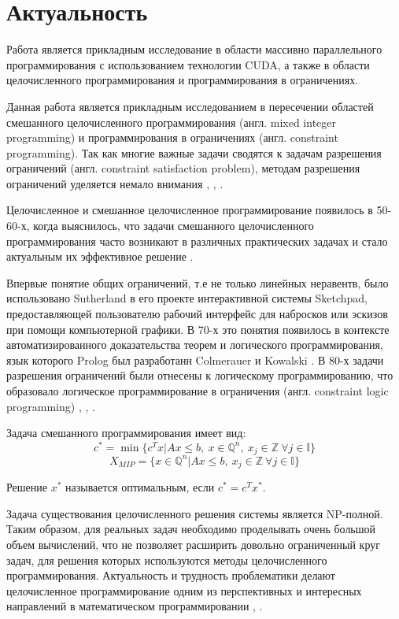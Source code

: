 \documentclass[a4paper,14pt,russian]{extreport}
\begin{document}
\section{Актуальность}

Работа является прикладным исследование в области массивно параллельного программирования с использованием технологии CUDA, а также в области целочисленного программирования и программирования в ограничениях.
\par Данная работа является прикладным исследованием в пересечении областей смешанного целочисленного программирования (англ. mixed integer programming) и программирования в ограничениях (англ. constraint programming). Так как многие важные задачи сводятся к задачам разрешения ограничений (англ. constraint satisfaction problem), методам разрешения ограничений уделяется немало внимания \cite{dechter}, \cite{freuder}, \cite{tsang}. 
\par Целочисленное и смешанное целочисленное программирование появилось в 50-60-х, когда выяснилось, что задачи смешанного целочисленного программирования часто возникают в различных практических задачах и стало актуальным их эффективное решение \cite{markowitz_manne}.
\par Впервые понятие общих ограничений, т.е не только линейных неравентв, было использовано Sutherland \cite{sutherland} в его проекте интерактивной системы Sketchpad, предоставляющей пользователю рабочий интерфейс для набросков или эскизов при помощи компьютерной графики. В 70-х это понятия появилось в контексте автоматизированного доказательства теорем и логического программирования, язык которого Prolog был разработанн Colmerauer \cite{colmerauer} и Kowalski \cite{kowalski}. В 80-х задачи разрешения ограничений были отнесены к логическому программированию, что образовало логическое программирование в ограничения (англ. constraint logic programming) \cite{jaffar_lassez}, \cite{dincbas}, \cite{colmerauer_2}.
\par Задача смешанного программирования имеет вид:
  $$c^* = \min\{c^Tx|Ax\le b,~ x\in \mathbb{Q}^n,~ x_j\in\mathbb{Z}~ \forall j\in\mathbb{I}\}$$
  $$X_{MIP}=\{x\in\mathbb{Q}^n|Ax\le b,~ x_j\in\mathbb{Z}~ \forall j\in\mathbb{I}\}$$
\par Решение $x^*$ называется оптимальным, если $c^* = c^Tx^*$.
\par Задача существования целочисленного решения системы является NP-полной. Таким образом, для реальных задач необходимо проделывать очень большой объем вычислений, что не позволяет расширить довольно ограниченный круг задач, для решения которых используются методы целочисленного программирования. Актуальность и трудность проблематики делают целочисленное программирование одним из перспективных и интересных направлений в математическом программировании \cite{karmanov}, \cite {balinski}.
\end{document}
